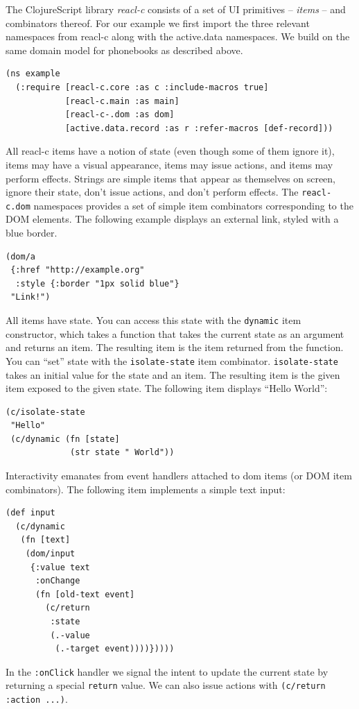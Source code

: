 \documentclass[sigplan,screen]{acmart}
\begin{document}
The ClojureScript library \textit{reacl-c} consists of a set of UI
primitives -- \textit{items} -- and combinators thereof. For our
example we first import the three relevant namespaces from reacl-c
along with the active.data namespaces. We build on the same domain
model for phonebooks as described above.
%
\begin{verbatim}
(ns example
  (:require [reacl-c.core :as c :include-macros true]
            [reacl-c.main :as main]
            [reacl-c-.dom :as dom]
            [active.data.record :as r :refer-macros [def-record]))
\end{verbatim}
%
All reacl-c items have a notion of state (even though some of them
ignore it), items may have a visual appearance, items may issue
actions, and items may perform effects. Strings are simple items that
appear as themselves on screen, ignore their state, don't issue
actions, and don't perform effects. The \texttt{reacl-c.dom}
namespaces provides a set of simple item combinators corresponding to
the DOM elements. The following example displays an external link,
styled with a blue border.
%
\begin{verbatim}
(dom/a
 {:href "http://example.org"
  :style {:border "1px solid blue"}
 "Link!")
\end{verbatim}
%
All items have state. You can access this state with the
\texttt{dynamic} item constructor, which takes a function that takes
the current state as an argument and returns an item. The resulting
item is the item returned from the function. You can ``set'' state
with the \texttt{isolate-state} item
combinator. \texttt{isolate-state} takes an initial value for the
state and an item. The resulting item is the given item exposed to the
given state. The following item displays ``Hello World'':
%
\begin{verbatim}
(c/isolate-state
 "Hello"
 (c/dynamic (fn [state]
             (str state " World"))
\end{verbatim}
%
Interactivity emanates from event handlers attached to dom items (or
DOM item combinators). The following item implements a simple text input:
%
\begin{verbatim}
(def input
  (c/dynamic
   (fn [text]
    (dom/input
     {:value text
      :onChange
      (fn [old-text event]
        (c/return
         :state
         (.-value
          (.-target event))))}))))
\end{verbatim}
%
In the \texttt{:onClick} handler we signal the intent to update the
current state by returning a special \texttt{return} value. We can
also issue actions with \texttt{(c/return :action ...)}.
\end{document}
